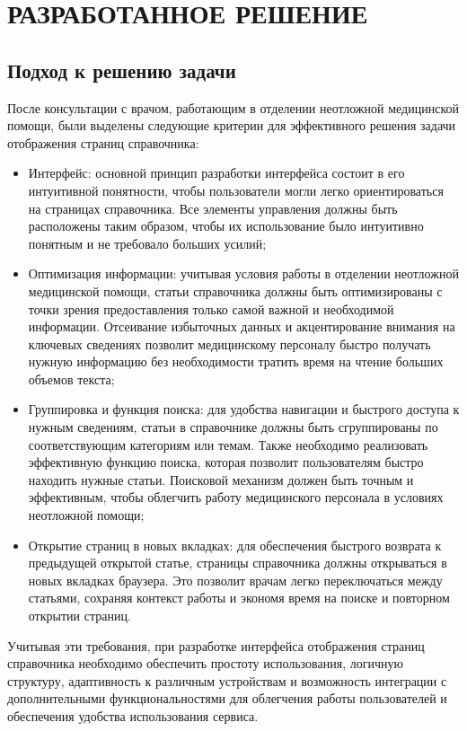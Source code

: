 \section{РАЗРАБОТАННОЕ РЕШЕНИЕ}

\subsection{Подход к решению задачи}

После консультации с врачом, работающим в отделении неотложной медицинской помощи, были выделены следующие критерии для эффективного решения задачи отображения страниц справочника:

\begin{itemize}
    \item Интерфейс: основной принцип разработки интерфейса состоит в его интуитивной понятности, чтобы пользователи могли легко ориентироваться на страницах справочника. Все элементы управления должны быть расположены таким образом, чтобы их использование было интуитивно понятным и не требовало больших усилий;
    \item Оптимизация информации: учитывая условия работы в отделении неотложной медицинской помощи, статьи справочника должны быть оптимизированы с точки зрения предоставления только самой важной и необходимой информации. Отсеивание избыточных данных и акцентирование внимания на ключевых сведениях позволит медицинскому персоналу быстро получать нужную информацию без необходимости тратить время на чтение больших объемов текста;
    \item Группировка и функция поиска: для удобства навигации и быстрого доступа к нужным сведениям, статьи в справочнике должны быть сгруппированы по соответствующим категориям или темам. Также необходимо реализовать эффективную функцию поиска, которая позволит пользователям быстро находить нужные статьи. Поисковой механизм должен быть точным и эффективным, чтобы облегчить работу медицинского персонала в условиях неотложной помощи;
    \item Открытие страниц в новых вкладках: для обеспечения быстрого возврата к предыдущей открытой статье, страницы справочника должны открываться в новых вкладках браузера. Это позволит врачам легко переключаться между статьями, сохраняя контекст работы и экономя время на поиске и повторном открытии страниц.
\end{itemize}

Учитывая эти требования, при разработке интерфейса отображения страниц справочника необходимо обеспечить простоту использования, логичную структуру, адаптивность к различным устройствам и возможность интеграции с дополнительными функциональностями для облегчения работы пользователей и обеспечения удобства использования сервиса.

